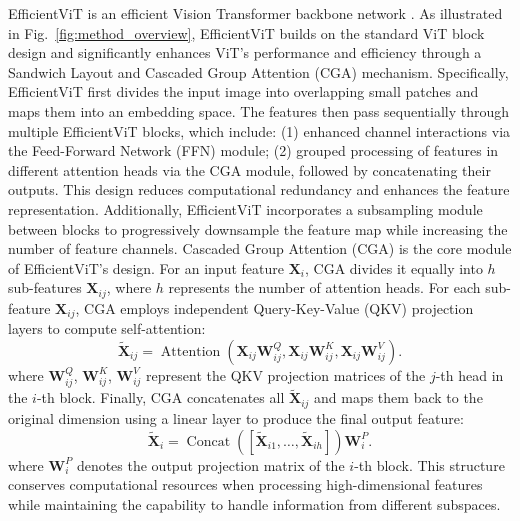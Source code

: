 \documentclass[a4paper,fleqn]{cas-sc}
\begin{document}
EfficientViT \citep{liu2023efficientvit} is an efficient Vision Transformer backbone network \citep{dosovitskiy2020image}. As illustrated in Fig.~\ref{fig:method_overview}, EfficientViT builds on the standard ViT block design and significantly enhances ViT’s performance and efficiency through a Sandwich Layout and Cascaded Group Attention (CGA) mechanism. Specifically, EfficientViT first divides the input image into overlapping small patches and maps them into an embedding space. The features then pass sequentially through multiple EfficientViT blocks, which include: (1) enhanced channel interactions via the Feed-Forward Network (FFN) module; (2) grouped processing of features in different attention heads via the CGA module, followed by concatenating their outputs. This design reduces computational redundancy and enhances the feature representation. Additionally, EfficientViT incorporates a subsampling module between blocks to progressively downsample the feature map while increasing the number of feature channels. Cascaded Group Attention (CGA) is the core module of EfficientViT’s design. For an input feature $\mathbf{X}_i$, CGA divides it equally into $h$ sub-features $\mathbf{X}_{ij}$, where $h$ represents the number of attention heads. For each sub-feature $\mathbf{X}_{ij}$, CGA employs independent Query-Key-Value (QKV) projection layers to compute self-attention:
\begin{equation}
	\tilde{\mathbf{X}}_{ij} = \operatorname{Attention}(\mathbf{X}_{ij}\mathbf{W}^Q_{ij}, \mathbf{X}_{ij}\mathbf{W}^K_{ij}, \mathbf{X}_{ij}\mathbf{W}^V_{ij}).
\end{equation}
where $\mathbf{W}^Q_{ij}$, $\mathbf{W}^K_{ij}$, $\mathbf{W}^V_{ij}$ represent the QKV projection matrices of the $j$-th head in the $i$-th block. Finally, CGA concatenates all $\tilde{\mathbf{X}}_{ij}$ and maps them back to the original dimension using a linear layer to produce the final output feature:
\begin{equation}
	\tilde{\mathbf{X}}_i = \operatorname{Concat}([\tilde{\mathbf{X}}_{i1}, \ldots, \tilde{\mathbf{X}}_{ih}])\mathbf{W}^P_i.
\end{equation}
where $\mathbf{W}^P_i$ denotes the output projection matrix of the $i$-th block. This structure conserves computational resources when processing high-dimensional features while maintaining the capability to handle information from different subspaces.
\end{document}
